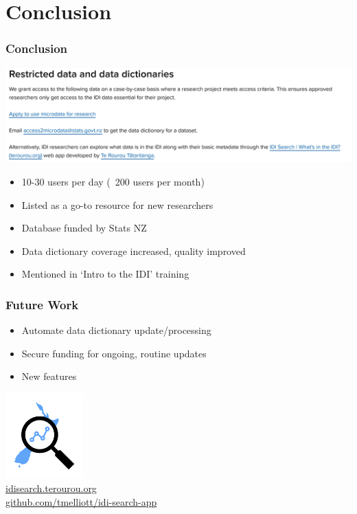 \documentclass{beamer}
\begin{document}
\section{Conclusion}

\begin{frame}
    \frametitle{Conclusion}

    \includegraphics[width=\linewidth]{conc1.png}

    \begin{itemize}
        \item 10-30 users per day (~200 users per month)
        \item Listed as a go-to resource for new researchers
        \item Database funded by Stats NZ
        \item Data dictionary coverage increased, quality improved
        \item Mentioned in `Intro to the IDI' training
    \end{itemize}
\end{frame}

\begin{frame}
    \frametitle{Future Work}

    \begin{itemize}
        \item Automate data dictionary update/processing
        \item Secure funding for ongoing, routine updates
        \item New features
    \end{itemize}
\end{frame}

\begin{frame}

    \begin{center}
        \includegraphics[width=3cm]{idisearch}\\
        \url{idisearch.terourou.org}\\
        \url{github.com/tmelliott/idi-search-app}
    \end{center}
\end{frame}
\end{document}

